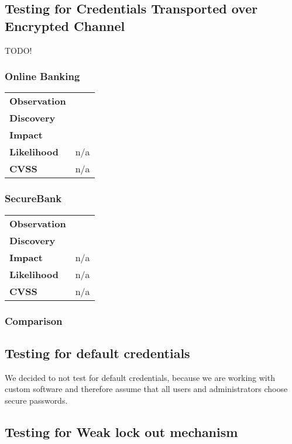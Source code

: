 \subsection{Testing for Credentials Transported over Encrypted Channel}

TODO!

\subsubsection*{Online Banking}

\begin{tabular}{l|p{10cm}}

\textbf{Observation} &   \\
\textbf{Discovery} &  \\
\textbf{Impact} &  \\
\textbf{Likelihood} & n/a \\
\textbf{CVSS} & n/a \\
\end{tabular}

\subsubsection*{SecureBank}

\begin{tabular}{l|p{10cm}}

\textbf{Observation} &  \\
\textbf{Discovery} & \\
\textbf{Impact} & n/a \\
\textbf{Likelihood} & n/a \\
\textbf{CVSS} & n/a \\
\end{tabular}

\subsubsection*{Comparison}

\clearpage


\subsection{Testing for default credentials}
We decided to not test for default credentials, because we are working with custom software and therefore assume that all users and administrators choose secure passwords.

\clearpage


\subsection{Testing for Weak lock out mechanism}

